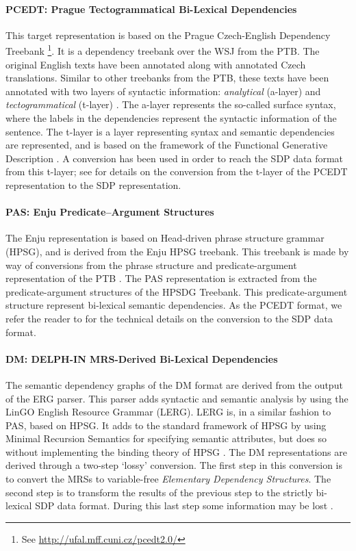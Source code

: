 \paragraph{PCEDT: Prague Tectogrammatical Bi-Lexical Dependencies} This target representation is based on the Prague Czech-English Dependency Treebank \cite{PCEDT}\footnote{See \url{http://ufal.mff.cuni.cz/pcedt2.0/}}. It is a dependency treebank over the WSJ from the PTB. The original English texts have been annotated along with annotated Czech translations. Similar to other treebanks from the PTB, these texts have been annotated with two layers of syntactic information: \textit{analytical} (a-layer) and \textit{tectogrammatical} (t-layer) \cite{Oepen:14}. The a-layer represents the so-called surface syntax, where the labels in the dependencies represent the syntactic information of the sentence. The t-layer is a layer representing syntax and semantic dependencies are represented, and is based on the framework of the Functional Generative Description \cite{Sgall:86}. A conversion has been used in order to reach the SDP data format from this t-layer; see  for details on the conversion from the t-layer of the PCEDT representation to the SDP representation.

\paragraph{PAS: Enju Predicate–Argument Structures} The Enju representation is based on Head-driven phrase structure grammar (HPSG), and is derived from the Enju HPSG treebank. This treebank is made by way of conversions from the phrase structure and predicate-argument representation of the PTB \cite{Oepen:14}. The PAS representation is extracted from the predicate-argument structures of the HPSDG Treebank. This predicate-argument structure represent bi-lexical semantic dependencies. As the PCEDT format, we refer the reader to  for the technical details on the conversion to the SDP data format.

\paragraph{DM: DELPH-IN MRS-Derived Bi-Lexical Dependencies} The semantic dependency graphs of the DM format are derived from the output of the ERG parser. This parser adds syntactic and semantic analysis by using the LinGO English Resource Grammar (LERG). LERG is, in a similar fashion to PAS, based on HPSG. It adds to the standard framework of HPSG by using Minimal Recursion Semantics for specifying semantic attributes, but does so without implementing the binding theory of HPSG \cite{Flickinger:00}. The DM representations are derived through a two-step `lossy' conversion. The first step in this conversion is to convert the MRSs to variable-free \textit{Elementary Dependency Structures}. The second step is to transform the results of the previous step to the strictly bi-lexical SDP data format. During this last step some information may be lost \cite{Miyao:14}.

